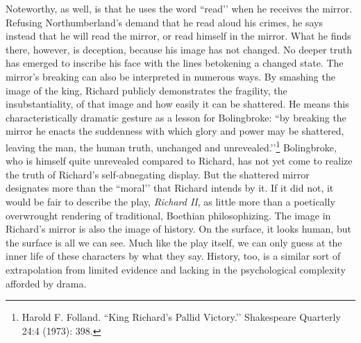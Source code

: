Noteworthy, as well, is that he uses the word ``read’’ when he receives the mirror.
Refusing Northumberland’s demand that he read aloud his crimes, he says instead that he will read the mirror, or read himself in the mirror.
What he finds there, however, is deception, because his image has not changed.
No deeper truth has emerged to inscribe his face with the lines betokening a changed state.
The mirror’s breaking can also be interpreted in numerous ways.
By smashing the image of the king, Richard publicly demonstrates the fragility, the insubstantiality, of that image and how easily it can be shattered.
He means this characteristically dramatic gesture as a lesson for Bolingbroke: ``by breaking the mirror he enacts the suddenness with which glory and power may be shattered, leaving the man, the human truth, unchanged and unrevealed.’’\footnote{Harold F. Folland. ``King Richard’s Pallid Victory.’’ Shakespeare Quarterly 24:4 (1973): 398.} Bolingbroke, who is himself quite unrevealed compared to Richard, has not yet come to realize the truth of Richard’s self-abnegating display.
But the shattered mirror designates more than the ``moral’’ that Richard intends by it.
If it did not, it would be fair to describe the play, \emph{Richard II}, as little more than a poetically overwrought rendering of traditional, Boethian philosophizing.
The image in Richard’s mirror is also the image of history.
On the surface, it looks human, but the surface is all we can see.
Much like the play itself, we can only guess at the inner life of these characters by what they say.
History, too, is a similar sort of extrapolation from limited evidence and lacking in the psychological complexity afforded by drama.

